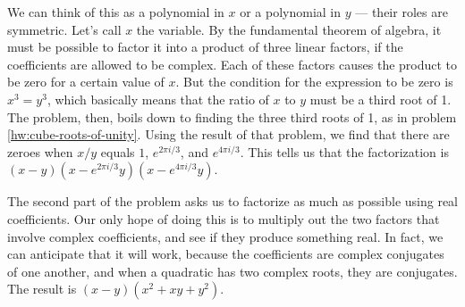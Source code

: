 We can think of this as a polynomial in $x$ or a polynomial in $y$ --- 
their roles are symmetric. Let's call $x$ the variable.  By the
fundamental theorem of algebra, it must be possible to factor it into
a product of three linear factors, if the coefficients are allowed to
be complex. Each of these factors causes the product to be zero for a
certain value of $x$. But the condition for the expression to be zero
is $x^3=y^3$, which basically means that the ratio of $x$ to $y$ must
be a third root of 1.  The problem, then, boils down to finding the
three third roots of 1, as in problem \ref{hw:cube-roots-of-unity}.
Using the result of that problem, we find that there are zeroes when
$x/y$ equals $1$, $e^{2\pi i/3}$, and $e^{4\pi i/3}$. This tells us
that the factorization is $(x-y)(x-e^{2\pi i/3}y)(x-e^{4\pi i/3}y)$.

The second part of the problem asks us to factorize as much as possible using real coefficients.
Our only hope of doing this is to multiply out the two factors that involve complex coefficients,
and see if they produce something real. In fact, we can anticipate that it will work, because
the coefficients are complex conjugates of one another, and when a quadratic has two complex
roots, they are conjugates. The result is $(x-y)(x^2+xy+y^2)$.

